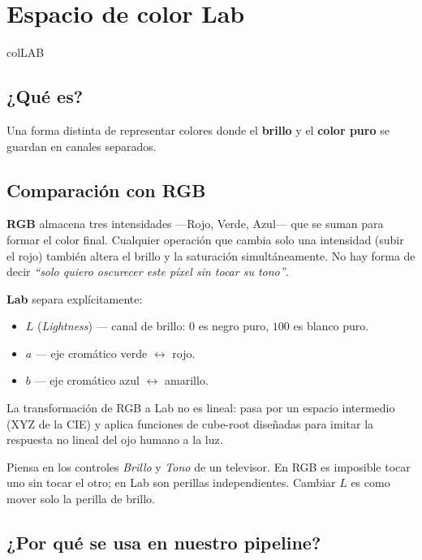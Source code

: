 \documentclass[11pt,a4paper]{article}
\begin{document}
\section{Espacio de color \textcolor{colLAB}{Lab}}
\begin{keybox}{colLAB}

\subsection*{¿Qué es?}

Una forma distinta de representar colores donde el \textbf{brillo} y el
\textbf{color puro} se guardan en canales separados.

\subsection*{Comparación con RGB}

\textbf{RGB} almacena tres intensidades —Rojo, Verde, Azul— que se suman para
formar el color final. Cualquier operación que cambia solo una intensidad
(subir el rojo) también altera el brillo y la saturación simultáneamente. No
hay forma de decir \emph{``solo quiero oscurecer este píxel sin tocar su tono''}.

\textbf{Lab} separa explícitamente:
\begin{itemize}
    \item \(L\) (\emph{Lightness}) — canal de brillo: \(0\) es negro puro, \(100\) es blanco puro.
    \item \(a\) — eje cromático verde \(\leftrightarrow\) rojo.
    \item \(b\) — eje cromático azul \(\leftrightarrow\) amarillo.
\end{itemize}

La transformación de RGB a Lab no es lineal: pasa por un espacio intermedio
(XYZ de la CIE) y aplica funciones de cube-root diseñadas para imitar la
respuesta no lineal del ojo humano a la luz.

\begin{analogy}
Piensa en los controles \emph{Brillo} y \emph{Tono} de un televisor. En RGB es
imposible tocar uno sin tocar el otro; en Lab son perillas independientes.
Cambiar \(L\) es como mover solo la perilla de brillo.
\end{analogy}

\subsection*{¿Por qué se usa en nuestro pipeline?}


\end{keybox}
\end{document}
